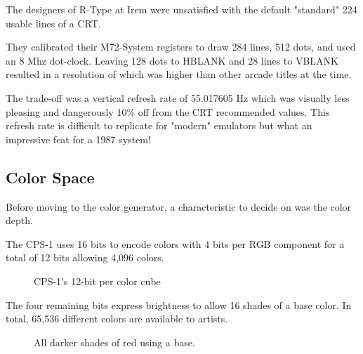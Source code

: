 \pagebreak

\label{sf2_ratio_solution}






\begin{trivia}
The designers of R-Type at Irem were unsatisfied with the default "standard" 224 usable lines of a CRT. 

They calibrated their M72-System registers to draw 284 lines, 512 dots, and used an 8 Mhz dot-clock. Leaving 128 dots to HBLANK and 28 lines to VBLANK resulted in a resolution of  which was higher than other arcade titles at the time. 

The trade-off was a vertical refresh rate of 55.017605 Hz which was visually less pleasing and dangerously 10\% off from the CRT recommended values. This refresh rate is difficult to replicate for "modern" emulators but what an impressive feat for a 1987 system!
\end{trivia}



\subsection{Color Space} 
Before moving to the color generator, a characteristic to decide on was the color depth. 

The CPS-1 uses 16 bits to encode colors with 4 bits per RGB component for a total of 12 bits allowing 4,096 colors. 


\begin{figure}[H]
\begin{minipage}[t]{0.49\linewidth}
\end{minipage}%
\hfill%
\begin{minipage}[t]{0.49\linewidth}
\end{minipage}
\caption*{CPS-1's 12-bit per color cube}
\end{figure}
  
The four remaining bits express brightness to allow 16 shades of a base color. In total, 65,536 different colors are available to artists.

\begin{figure}[H]
\caption*{All darker shades of red using a  base.}
\end{figure}

